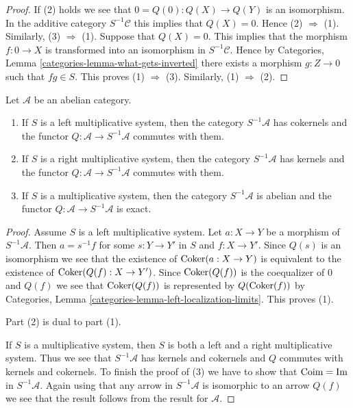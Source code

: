 \begin{proof}
If (2) holds we see that $0 = Q(0) : Q(X) \to Q(Y)$ is an isomorphism.
In the additive category $S^{-1}\mathcal{C}$ this implies that $Q(X) = 0$.
Hence (2) $\Rightarrow$ (1). Similarly, (3) $\Rightarrow$ (1).
Suppose that $Q(X) = 0$. This implies that the morphism
$f : 0 \to X$ is transformed into an isomorphism in $S^{-1}\mathcal{C}$.
Hence by
Categories, Lemma \ref{categories-lemma-what-gets-inverted}
there exists a morphism $g : Z \to 0$ such that $fg \in S$. This proves
(1) $\Rightarrow$ (3). Similarly, (1) $\Rightarrow$ (2).
\end{proof}

\begin{lemma}
\label{lemma-localization-abelian}
Let $\mathcal{A}$ be an abelian category.
\begin{enumerate}
\item If $S$ is a left multiplicative system, then
the category $S^{-1}\mathcal{A}$ has cokernels and the functor
$Q : \mathcal{A} \to S^{-1}\mathcal{A}$ commutes with them.
\item If $S$ is a right multiplicative system, then
the category $S^{-1}\mathcal{A}$ has kernels and the functor
$Q : \mathcal{A} \to S^{-1}\mathcal{A}$ commutes with them.
\item If $S$ is a multiplicative system, then the category
$S^{-1}\mathcal{A}$ is abelian and the functor
$Q : \mathcal{A} \to S^{-1}\mathcal{A}$ is exact.
\end{enumerate}
\end{lemma}

\begin{proof}
Assume $S$ is a left multiplicative system. Let $a : X \to Y$ be a morphism
of $S^{-1}\mathcal{A}$. Then $a = s^{-1}f$ for some $s : Y \to Y'$
in $S$ and $f : X \to Y'$. Since $Q(s)$ is an isomorphism we see that
the existence of $\mathop{\mathrm{Coker}}(a : X \to Y)$ is equivalent to the existence
of $\mathop{\mathrm{Coker}}(Q(f) : X \to Y')$. Since $\mathop{\mathrm{Coker}}(Q(f))$ is the
coequalizer of $0$ and $Q(f)$ we see that $\mathop{\mathrm{Coker}}(Q(f))$ is
represented by $Q(\mathop{\mathrm{Coker}}(f))$ by
Categories, Lemma \ref{categories-lemma-left-localization-limits}.
This proves (1).

\medskip\noindent
Part (2) is dual to part (1).

\medskip\noindent
If $S$ is a multiplicative system, then $S$ is both a left and a right
multiplicative system. Thus we see that $S^{-1}\mathcal{A}$ has
kernels and cokernels and $Q$ commutes with kernels and cokernels.
To finish the proof of (3) we have to show that $\mathop{\mathrm{Coim}} = \mathop{\mathrm{Im}}$ in
$S^{-1}\mathcal{A}$. Again using that any arrow in $S^{-1}\mathcal{A}$
is isomorphic to an arrow $Q(f)$ we see that the result follows
from the result for $\mathcal{A}$.
\end{proof}




